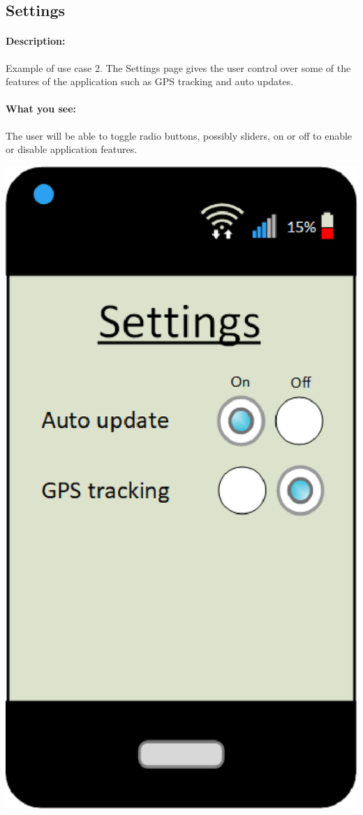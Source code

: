 \documentclass[a4paper]{article}
\begin{document}
\subsection{Settings}
\paragraph{Description:}
Example of use case 2. The Settings page gives the user control over some of the features of the application such as GPS tracking and auto updates.
\paragraph{What you see:} The user will be able to toggle radio buttons, possibly sliders, on or off to enable or disable application features.
\begin{center}\includegraphics[scale=.8]{Settings.eps}\end{center}
\pagebreak
\end{document}
